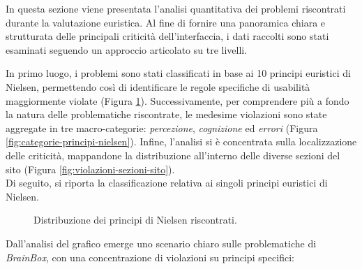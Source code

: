 In questa sezione viene presentata l'analisi quantitativa dei problemi riscontrati durante la valutazione euristica. Al fine di fornire una panoramica chiara e strutturata delle principali criticità dell'interfaccia, i dati raccolti sono stati esaminati seguendo un approccio articolato su tre livelli. 

In primo luogo, i problemi sono stati classificati in base ai 10 principi euristici di Nielsen, permettendo così di identificare le regole specifiche di usabilità maggiormente violate (Figura \ref{fig:violazioni-nielsen}). Successivamente, per comprendere più a fondo la natura delle problematiche riscontrate, le medesime violazioni sono state aggregate in tre macro-categorie: \textit{percezione}, \textit{cognizione} ed \textit{errori} (Figura \ref{fig:categorie-principi-nielsen}). Infine, l'analisi si è concentrata sulla localizzazione delle criticità, mappandone la distribuzione all'interno delle diverse sezioni del sito (Figura \ref{fig:violazioni-sezioni-sito}). \\

Di seguito, si riporta la classificazione relativa ai singoli principi euristici di Nielsen.

\begin{figure}[H]
  \centering
  \caption{Distribuzione dei principi di Nielsen riscontrati.}
  \label{fig:violazioni-nielsen}
\end{figure}

Dall'analisi del grafico emerge uno scenario chiaro sulle problematiche di \textit{BrainBox}, con una concentrazione di violazioni su principi specifici:

